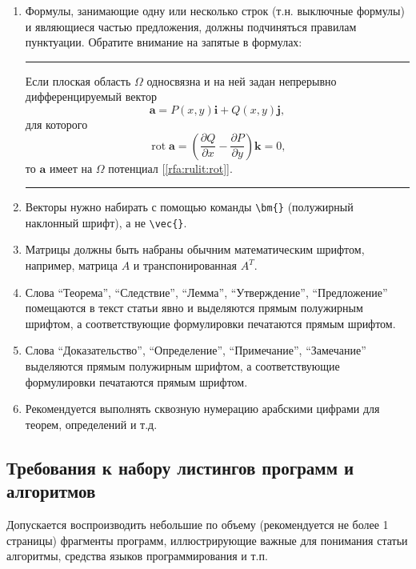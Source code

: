 \documentclass[10pt,a4paper]{book}
\begin{document}
\begin{enumerate}[itemsep=0pt,parsep=2pt,topsep=2pt,partopsep=0pt]
\item Формулы, занимающие одну или несколько строк (т.н. выключные формулы) и являющиеся
      частью предложения, должны подчиняться правилам пунктуации. Обратите внимание на
	  запятые в формулах:
	  \vspace*{2mm}\hrule\vspace*{2mm}
	  Если плоская область $\Omega$ односвязна и на ней задан непрерывно дифференцируемый вектор
	  \begin{equation}
	  \bm{a} = P(x,y)\bm{i}+Q(x,y)\bm{j},   %
	  \end{equation}
	  для которого
	  \begin{equation}
	  \mathop{\mathrm{rot}}\bm{a}=\left(\frac{\partial Q}{\partial x} - \frac{\partial P}{\partial y}\right)\bm{k}=0,
	  \end{equation}
	  то $\bm{a}$ имеет на $\Omega$ потенциал [\ref{rfa:rulit:rot}].
	  \vspace*{2mm}\hrule\vspace*{4mm}
\item Векторы нужно набирать с помощью команды \verb!\bm{}! (полужирный наклонный шрифт), 
      а не \verb!\vec{}!.
\item Матрицы должны быть набраны обычним математическим шрифтом, например, 
      матрица $A$ и транспонированная $A^T$.
\item Слова ``Теорема'', ``Следствие'', ``Лемма'', ``Утверждение'', ``Предложение''
      помещаются в текст статьи явно и выделяются прямым полужирным 
      шрифтом, а соответствующие формулировки печатаются прямым шрифтом.
\item Слова ``Доказательство'', ``Определение'', ``Примечание'', ``Замечание'' выделяются 
      прямым полужирным шрифтом, а соответствующие формулировки печатаются прямым шрифтом.
\item Рекомендуется выполнять сквозную нумерацию арабскими цифрами для теорем, %
      определений и т.д. 
\end{enumerate}

\subsection{Требования к набору листингов программ и алгоритмов}
Допускается воспроизводить небольшие по объему (рекомендуется не более 1 страницы)
фрагменты программ, иллюстрирующие важные для понимания статьи алгоритмы, средства
языков программирования и т.п.
\end{document}
